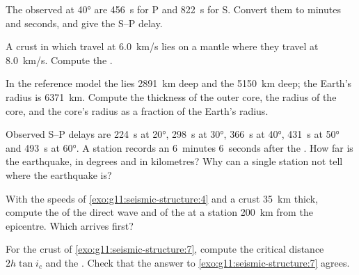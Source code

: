 \begin{exercise}[$\star$]\label{exo:g11:seismic-structure:3}
The observed  at \ang{40} are \qty{456}{s} for P and
\qty{822}{s} for S. Convert them to minutes and seconds, and give the S--P
delay.
\end{exercise}

\begin{exercise}[$\star$]\label{exo:g11:seismic-structure:4}
A crust in which  travel at \qty{6.0}{km/s} lies on a mantle where
they travel at \qty{8.0}{km/s}. Compute the .
\end{exercise}

\begin{exercise}[$\star$]\label{exo:g11:seismic-structure:5}
In the reference model the  lies \qty{2891}{km} deep and
the  \qty{5150}{km} deep; the Earth's radius is
\qty{6371}{km}. Compute the thickness of the outer core, the radius of the
core, and the core's radius as a fraction of the Earth's radius.
\end{exercise}

\begin{exercise}[$\star\star$]\label{exo:g11:seismic-structure:6}
Observed S--P delays are \qty{224}{s} at \ang{20}, \qty{298}{s} at
\ang{30}, \qty{366}{s} at \ang{40}, \qty{431}{s} at \ang{50} and
\qty{493}{s} at \ang{60}. A station records an  6~minutes 6~seconds
after the . How far is the earthquake, in degrees and in kilometres?
Why can a single station not tell where the earthquake is?
\end{exercise}

\begin{exercise}[$\star\star$]\label{exo:g11:seismic-structure:7}
With the speeds of \cref{exo:g11:seismic-structure:4} and a crust
\qty{35}{km} thick, compute the  of the direct wave and of the
 at a station \qty{200}{km} from the epicentre. Which arrives first?
\end{exercise}

\begin{exercise}[$\star\star$]\label{exo:g11:seismic-structure:8}
For the crust of \cref{exo:g11:seismic-structure:7}, compute the critical
distance $2h\tan i_c$ and the . Check that the answer to
\cref{exo:g11:seismic-structure:7} agrees.
\end{exercise}

